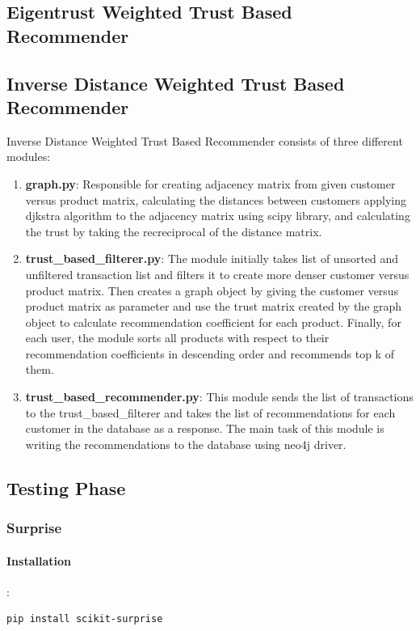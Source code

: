 \documentclass[12pt]{article}
\begin{document}
\subsection{Eigentrust Weighted Trust Based Recommender}
\subsection{Inverse Distance Weighted Trust Based Recommender}
Inverse Distance Weighted Trust Based Recommender consists of three different modules: \\
\begin{enumerate}
\item \textbf{graph.py}: Responsible for creating adjacency matrix from given customer versus product matrix, calculating the distances between customers applying djkstra algorithm to the adjacency matrix using scipy library, and calculating the trust by taking the recreciprocal of the distance matrix.
\item \textbf{trust\_based\_filterer.py}: The module initially takes list of unsorted and unfiltered transaction list and filters it to create more denser customer versus product matrix. Then creates a graph object by giving the customer versus product matrix as parameter and use the trust matrix created by the graph object to calculate recommendation coefficient for each product. Finally, for each user, the module sorts all products with respect to their recommendation coefficients in descending order and recommends top k of them.
\item \textbf{trust\_based\_recommender.py}: This module sends the list of transactions to the trust\_based\_filterer and takes the list of recommendations for each customer in the database as a response. The main task of this module is writing the recommendations to the database using neo4j driver.
\end{enumerate}
\subsection{Testing Phase}
\subsubsection{Surprise}
\paragraph{Installation}:
\begin{lstlisting}[language=bash]
 pip install scikit-surprise
\end{lstlisting}
\end{document}

